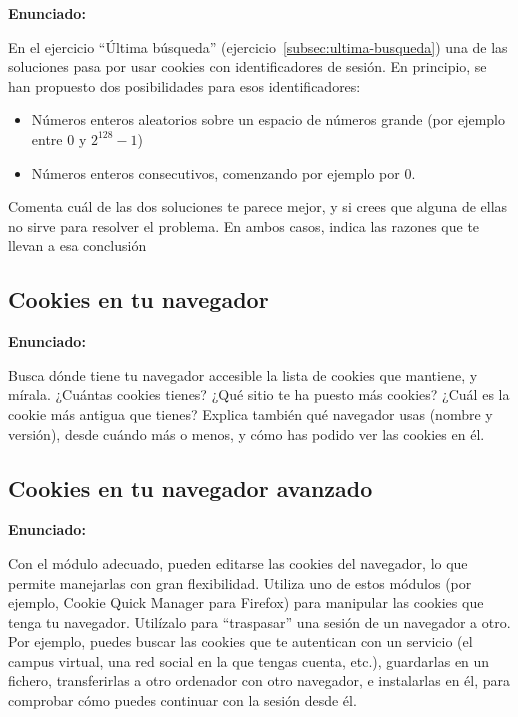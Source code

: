 \textbf{Enunciado:}

En el ejercicio ``Última búsqueda'' (ejercicio~\ref{subsec:ultima-busqueda}) una de las soluciones pasa por usar cookies con identificadores de sesión. En principio, se han propuesto dos posibilidades para esos identificadores:

\begin{itemize}
\item Números enteros aleatorios sobre un espacio de números grande (por ejemplo entre 0 y $2^{128}-1$)
\item Números enteros consecutivos, comenzando por ejemplo por 0.
\end{itemize}

Comenta cuál de las dos soluciones te parece mejor, y si crees que alguna de ellas no sirve para resolver el problema. En ambos casos, indica las razones que te llevan a esa conclusión


\subsection{Cookies en tu navegador}
\label{subsec:cookies-navegador}

\textbf{Enunciado:}

Busca dónde tiene tu navegador accesible la lista de cookies que mantiene, y mírala. ¿Cuántas cookies tienes? ¿Qué sitio te ha puesto más cookies? ¿Cuál es la cookie más antigua que tienes? Explica también qué navegador usas (nombre y versión), desde cuándo más o menos, y cómo has podido ver las cookies en él.


\subsection{Cookies en tu navegador avanzado}
\label{subsec:cookies-navegador-2}

\textbf{Enunciado:}

Con el módulo adecuado, pueden editarse las cookies del navegador, lo que permite manejarlas con gran flexibilidad. Utiliza uno de estos módulos (por ejemplo, Cookie Quick Manager para Firefox) para manipular las cookies que tenga tu navegador. Utilízalo para ``traspasar'' una sesión de un navegador a otro. Por ejemplo, puedes buscar las cookies que te autentican con un servicio (el campus virtual, una red social en la que tengas cuenta, etc.), guardarlas en un fichero, transferirlas a otro ordenador con otro navegador, e instalarlas en él, para comprobar cómo puedes continuar con la sesión desde él.

